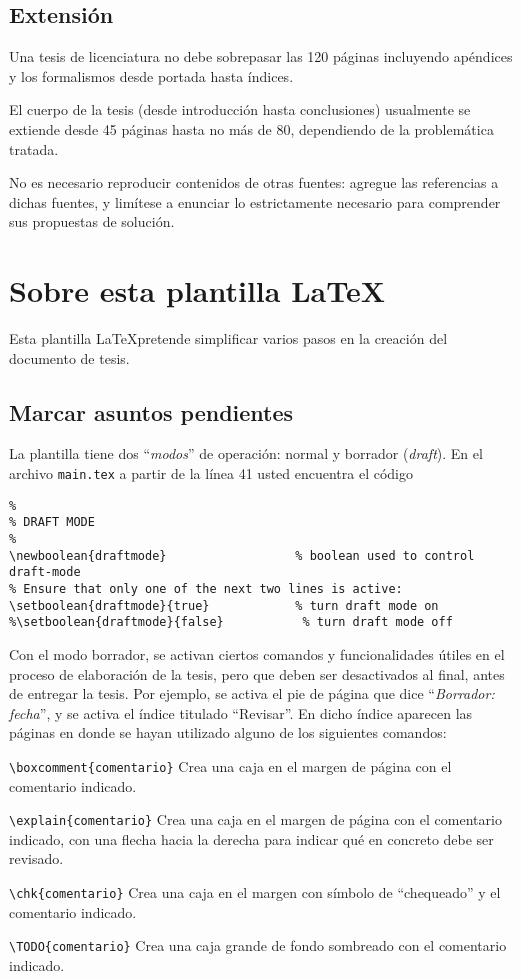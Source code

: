 \subsection{Extensión}

Una tesis de licenciatura no debe sobrepasar las 120 páginas incluyendo
apéndices y los formalismos desde portada hasta índices.

El cuerpo de la tesis (desde introducción hasta conclusiones) usualmente se
extiende desde 45 páginas hasta no más de 80, dependiendo de la problemática
tratada.

No es necesario reproducir contenidos de otras fuentes: agregue las referencias
a dichas fuentes, y limítese a enunciar lo estrictamente necesario para
comprender sus propuestas de solución.

\section{Sobre esta plantilla \LaTeX}

Esta plantilla \LaTeX pretende simplificar varios pasos en la creación del
documento de tesis.

\subsection{Marcar asuntos pendientes}

La plantilla tiene dos ``\emph{modos}'' de operación: normal y borrador
(\emph{draft}).  En el archivo \texttt{main.tex} a partir de la línea 41 usted
encuentra el código

\begin{verbatim}
%
% DRAFT MODE
%
\newboolean{draftmode}                  % boolean used to control draft-mode
% Ensure that only one of the next two lines is active:
\setboolean{draftmode}{true}            % turn draft mode on
%\setboolean{draftmode}{false}           % turn draft mode off
\end{verbatim}

Con el modo borrador, se activan ciertos comandos y funcionalidades útiles en
el proceso de elaboración de la tesis, pero que deben ser desactivados al
final, antes de entregar la tesis.  Por ejemplo, se activa el pie de página que
dice ``\emph{Borrador: fecha}'', y se activa el índice titulado ``Revisar''.  En dicho índice aparecen las páginas en donde se hayan utilizado alguno de los siguientes comandos:
\begin{compactitem}
\item \verb+\boxcomment{comentario}+ Crea una caja en el margen de página con
  el comentario indicado.
\item \verb+\explain{comentario}+ Crea una caja en el margen de página con
  el comentario indicado, con una flecha hacia la derecha para indicar qué en
  concreto debe ser revisado.
\item \verb+\chk{comentario}+ Crea una caja en el margen con símbolo de
  ``chequeado'' y el comentario indicado.
\item \verb+\TODO{comentario}+ Crea una caja grande de fondo sombreado con el
  comentario indicado.
\end{compactitem}

